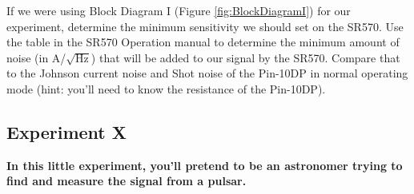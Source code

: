 \documentclass{../lab}
\begin{document}
If we were using Block Diagram I (Figure \ref{fig:BlockDiagramI}) for our experiment, determine the minimum sensitivity we should set on the SR570. Use the table in the SR570 Operation manual to determine the minimum amount of noise (in A/$\sqrt{\text{Hz}}$) that will be added to our signal by the SR570. Compare that to the Johnson current noise and Shot noise of the Pin-10DP in normal operating mode (hint: you'll need to know the resistance of the Pin-10DP).

\subsection{Experiment X}

\textbf{In this little experiment, you'll pretend to be an astronomer trying to find and measure the signal from a pulsar.}
\end{document}
